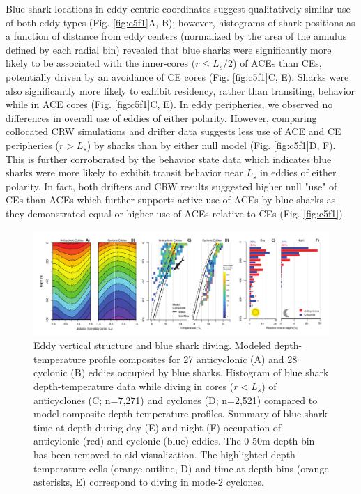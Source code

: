 Blue shark locations in eddy-centric coordinates suggest qualitatively similar use of both eddy types (Fig. \cref{fig:c5f1}A, B); however, histograms of shark positions as a function of distance from eddy centers (normalized by the area of the annulus defined by each radial bin) revealed that blue sharks were significantly more likely to be associated with the inner-cores ($r \leq L_s / 2$) of ACEs than CEs, potentially driven by an avoidance of CE cores (Fig. \cref{fig:c5f1}C, E). Sharks were also significantly more likely to exhibit residency, rather than transiting, behavior while in ACE cores (Fig. \cref{fig:c5f1}C, E). In eddy peripheries, we observed no differences in overall use of eddies of either polarity. However, comparing collocated CRW simulations and drifter data suggests less use of ACE and CE peripheries ($r > L_s$) by sharks than by either null model (Fig. \cref{fig:c5f1}D, F). This is further corroborated by the behavior state data which indicates blue sharks were more likely to exhibit transit behavior near $L_s$ in eddies of either polarity. In fact, both drifters and CRW results suggested higher null "use" of CEs than ACEs which further supports active use of ACEs by blue sharks as they demonstrated equal or higher use of ACEs relative to CEs (Fig. \cref{fig:c5f1}).

\begin{figure}[htbp]
\centering
\includegraphics[width=\textwidth]{images/C5_Fig2.pdf}
\caption[Eddy vertical structure and blue shark diving]{Eddy vertical structure and blue shark diving. Modeled depth-temperature profile composites for 27 anticyclonic (A) and 28 cyclonic (B) eddies occupied by blue sharks. Histogram of blue shark depth-temperature data while diving in cores ($r < L_s$) of anticyclones (C; n=7,271) and cyclones (D; n=2,521) compared to model composite depth-temperature profiles. Summary of blue shark time-at-depth during day (E) and night (F) occupation of anticylonic (red) and cyclonic (blue) eddies. The 0-50m depth bin has been removed to aid visualization. The highlighted depth-temperature cells (orange outline, D) and time-at-depth bins (orange asterisks, E) correspond to diving in mode-2 cyclones.}
\label{fig:c5f2}
\end{figure}

